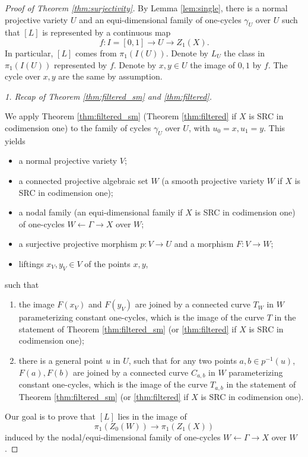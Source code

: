 \documentclass{amsart}
\theoremstyle{definition}
\theoremstyle{remark}
\begin{document}
\begin{proof}[Proof of Theorem \ref{thm:surjectivity}]
By Lemma \ref{lem:single}, there is a normal projective variety $U$ and an equi-dimensional family of one-cycles $\gamma_U$ over $U$ such that $[L]$ is represented by a continuous map
\[
f: I=[0, 1] \to U \to Z_1(X).
\]
In particular, $[L]$ comes from $\pi_1(I(U))$.
Denote by $L_U$ the class in $\pi_1(I(U))$ represented by $f$.
Denote by $x, y \in U$ the image of $0, 1$ by $f$. The cycle over $x, y$ are the same by assumption. 

\textit{1. Recap of Theorem \ref{thm:filtered_sm} and \ref{thm:filtered}.}


We apply Theorem \ref{thm:filtered_sm} (Theorem \ref{thm:filtered} if $X$ is SRC in codimension one) to the family of cycles $\gamma_U$ over $U$, with $u_0=x, u_1=y$. 
This yields
\begin{itemize}
    \item a normal projective variety $V$;
    \item  a connected projective algebraic set $W$ (a smooth projective variety $W$ if $X$ is SRC in codimension one);
    \item a nodal family (an equi-dimensional family if $X$ is SRC in codimension one) of one-cycles $W \leftarrow \Gamma \to X$ over $W$;
    \item a surjective projective morphism $p: V \to  U$ and a morphism $F: V \to W$;
    \item liftings $x_V, y_V \in V$ of the points $x, y$,
\end{itemize}   such that
\begin{enumerate}
    \item \label{c1} the image $F(x_V)$ and $F(y_V)$ are joined by a connected curve $T_W$ in $W$ parameterizing constant one-cycles, which is the image of the curve $T$ in the statement of Theorem \ref{thm:filtered_sm} (or \ref{thm:filtered} if $X$ is SRC in codimension one);
    
    \item \label{c3} there is a general point $u$ in $U$, such that for any two points  $a, b \in p^{-1}(u)$, $F(a), F(b)$ are joined by a connected curve $C_{a, b}$ in $W$ parameterizing constant one-cycles,  which is the image of the curve $T_{a, b}$ in the statement of Theorem \ref{thm:filtered_sm} (or \ref{thm:filtered} if $X$ is SRC in codimension one). 
\end{enumerate}
    
    
Our goal is to prove that $[L]$ lies in the image of 
\[
\pi_1(Z_0(W)) \to \pi_1(Z_1(X))
\]
induced by the nodal/equi-dimensional family of one-cycles $W \leftarrow \Gamma \to X$ over $W$.


\end{proof}
\end{document}
